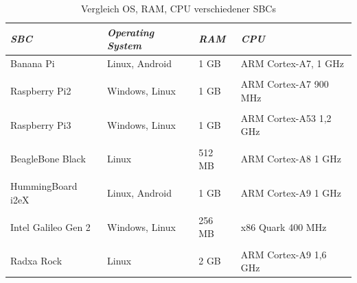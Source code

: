 \begin{table}[H]
\centering
\begin{tabular}{
llll
}
\toprule
\multicolumn{1}{p{3cm}}{\textit{\ac{SBC}}} & \multicolumn{1}{p{3.5cm}}{\textit{Operating System} } & \multicolumn{1}{p{1,5cm}}{\textit{RAM} }&\multicolumn{1}{p{3cm}}{ \centering\textit{CPU} }\\\midrule
Banana Pi & Linux, Android & 1 GB & ARM Cortex-A7, 1 GHz\\
&&&\\
Raspberry Pi2&Windows, Linux&1 GB&ARM Cortex-A7 900 MHz\\
&&&\\
Raspberry Pi3&Windows, Linux&1 GB&ARM Cortex-A53 1,2 GHz\\
&&&\\
BeagleBone Black & Linux & 512 MB & ARM Cortex-A8 1 GHz\\
&&&\\
HummingBoard i2eX & Linux, Android & 1 GB & ARM Cortex-A9 1 GHz\\
&&&\\
Intel Galileo Gen 2 & Windows, Linux & 256 MB & x86 Quark 400 MHz\\
&&&\\
Radxa Rock & Linux & 2 GB & ARM Cortex-A9 1,6 GHz\\
\bottomrule
\end{tabular}
\caption{Vergleich OS, RAM, CPU verschiedener SBCs}
\label{Tabelle_Vergleich_SBC1}
\end{table}

